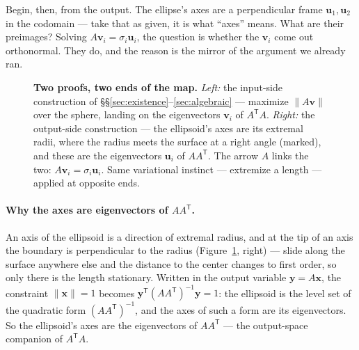\documentclass[11pt]{article}
\numberwithin{equation}{section}
\newcommand{\T}{^{\mathsf{T}}}
\newcommand{\vv}[1]{\mathbf{v}_{#1}}
\newcommand{\uu}[1]{\mathbf{u}_{#1}}
\theoremstyle{plainish}
\begin{document}
Begin, then, from the output. The ellipse's axes are a perpendicular frame
$\uu1, \uu2$ in the codomain --- take that as given, it is what ``axes'' means.
What are their preimages? Solving $A\vv i = \sigma_i \uu i$, the question is
whether the $\vv i$ come out orthonormal. They do, and the reason is the mirror
of the argument we already ran.

\begin{figure}[htbp]
\centering

\caption{\textbf{Two proofs, two ends of the map.} \emph{Left:} the input-side
construction of \S\S\ref{sec:existence}--\ref{sec:algebraic} --- maximize
$\|A\mathbf{v}\|$ over the sphere, landing on the eigenvectors $\vv i$ of
$A\T A$. \emph{Right:} the output-side construction --- the ellipsoid's axes are
its extremal radii, where the radius meets the surface at a right angle (marked),
and these are the eigenvectors $\uu i$ of $AA\T$. The arrow $A$ links the two:
$A\vv i = \sigma_i \uu i$. Same variational instinct --- extremize a length ---
applied at opposite ends.}
\label{fig:dual-geo}
\end{figure}

\paragraph{Why the axes are eigenvectors of $AA\T$.} An axis of the ellipsoid is
a direction of extremal radius, and at the tip of an axis the boundary is
perpendicular to the radius (Figure~\ref{fig:dual-geo}, right) --- slide along
the surface anywhere else and the distance to the center changes to first order,
so only there is the length stationary. Written in the output variable
$\mathbf{y} = A\mathbf{x}$, the constraint $\|\mathbf{x}\| = 1$ becomes
$\mathbf{y}\T (AA\T)^{-1} \mathbf{y} = 1$: the ellipsoid is the level set of the
quadratic form $(AA\T)^{-1}$, and the axes of such a form are its eigenvectors.
So the ellipsoid's axes are the eigenvectors of $AA\T$ --- the output-space
companion of $A\T A$.
\end{document}

